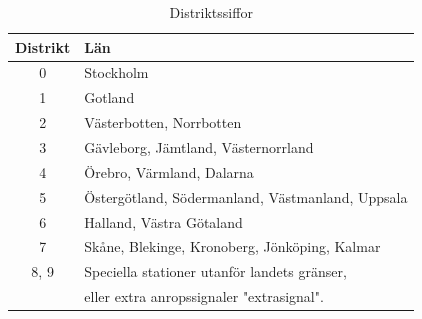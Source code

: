 \begin{table}[h]
	\centering
\begin{tabular}{cl}
	\textbf{Distrikt} & \textbf{Län}                                     \\ \hline %
	      0           & Stockholm                                        \\
	      1           & Gotland                                          \\
	      2           & Västerbotten, Norrbotten                         \\
	      3           & Gävleborg, Jämtland, Västernorrland              \\
	      4           & Örebro, Värmland, Dalarna                        \\
	      5           & Östergötland, Södermanland, Västmanland, Uppsala \\
	      6           & Halland, Västra Götaland                         \\
	      7           & Skåne, Blekinge, Kronoberg, Jönköping, Kalmar    \\
	      8, 9        & Speciella stationer utanför landets gränser, \\
	                  & eller extra anropssignaler "extrasignal".\\
\end{tabular}
\caption{Distriktssiffor}
\end{table}

